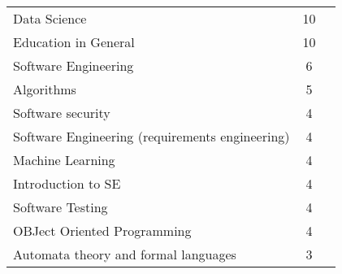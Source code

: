 \begin{table}[ht]
\begin{tabular}{l c p{4cm}}
		Data Science & 10 \\
		Education in General & 10 \\
		Software Engineering & 6 \\
		Algorithms & 5 \\
		Software security & 4 \\
		Software Engineering (requirements engineering) & 4 \\
		Machine Learning & 4 \\
		Introduction to SE & 4 \\
		Software Testing & 4 \\
		OBJect Oriented Programming & 4 \\
		Automata theory and formal languages & 3 \\

\end{tabular}
\end{table}
